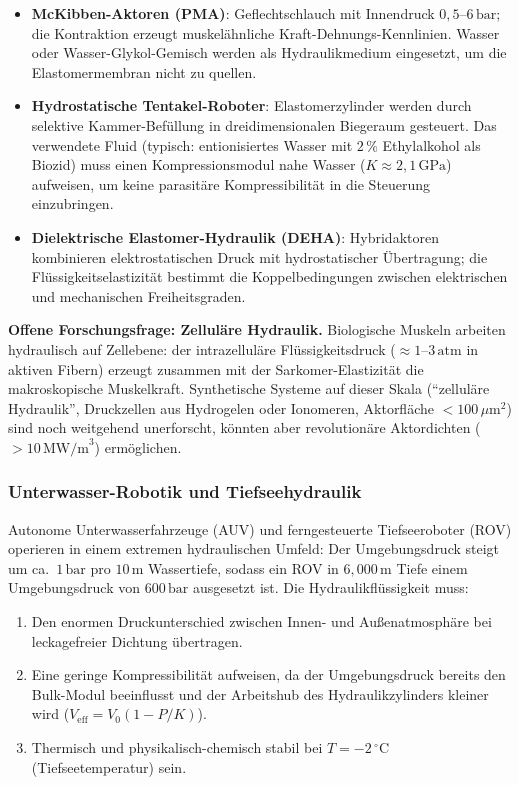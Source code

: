 ﻿\documentclass[a4paper,12pt]{scrreprt}
\theoremstyle{definition}
\begin{document}
\begin{itemize}
  \item \textbf{McKibben-Aktoren (PMA)}: Geflechtschlauch mit
    Innendruck $0{,}5$--$6\,\mathrm{bar}$; die Kontraktion erzeugt
    muskelähnliche Kraft-Dehnungs-Kennlinien. Wasser oder
    Wasser-Glykol-Gemisch werden als Hydraulikmedium eingesetzt,
    um die Elastomermembran nicht zu quellen.
  \item \textbf{Hydrostatische Tentakel-Roboter}: Elastomerzylinder
    werden durch selektive Kammer-Befüllung in dreidimensionalen
    Biegeraum gesteuert. Das verwendete Fluid (typisch:
    entionisiertes Wasser mit $2\,\%$ Ethylalkohol als Biozid)
    muss einen Kompressionsmodul nahe Wasser ($K \approx 2{,}1\,\mathrm{GPa}$)
    aufweisen, um keine parasitäre Kompressibilität in die Steuerung
    einzubringen.
  \item \textbf{Dielektrische Elastomer-Hydraulik (DEHA)}: Hybridaktoren
    kombinieren elektrostatischen Druck mit hydrostatischer Übertragung;
    die Flüssigkeitselastizität bestimmt die Koppelbedingungen zwischen
    elektrischen und mechanischen Freiheitsgraden.
\end{itemize}

\begin{infobox}
\textbf{Offene Forschungsfrage: Zelluläre Hydraulik.}
Biologische Muskeln arbeiten hydraulisch auf Zellebene: der intrazelluläre
Flüssigkeitsdruck ($\approx 1$--$3\,\mathrm{atm}$ in aktiven Fibern)
erzeugt zusammen mit der Sarkomer-Elastizität die makroskopische
Muskelkraft. Synthetische Systeme auf dieser Skala (``zelluläre
Hydraulik'', Druckzellen aus Hydrogelen oder Ionomeren,
Aktorfläche $< 100\,\mu\mathrm{m}^2$) sind noch weitgehend
unerforscht, könnten aber revolutionäre Aktordichten
($> 10\,\mathrm{MW/m}^3$) ermöglichen.
\end{infobox}

\subsubsection{Unterwasser-Robotik und Tiefseehydraulik}

Autonome Unterwasserfahrzeuge (AUV) und ferngesteuerte Tiefseeroboter
(ROV) operieren in einem extremen hydraulischen Umfeld: Der
Umgebungsdruck steigt um ca.\ $1\,\mathrm{bar}$ pro $10\,\mathrm{m}$
Wassertiefe, sodass ein ROV in $6{,}000\,\mathrm{m}$ Tiefe einem
Umgebungsdruck von $600\,\mathrm{bar}$ ausgesetzt ist. Die
Hydraulikflüssigkeit muss:

\begin{enumerate}
  \item Den enormen Druckunterschied zwischen Innen- und Außenatmosphäre
    bei leckagefreier Dichtung übertragen.
  \item Eine geringe Kompressibilität aufweisen, da der Umgebungsdruck
    bereits den Bulk-Modul beeinflusst und der Arbeitshub des
    Hydraulikzylinders kleiner wird ($V_{\mathrm{eff}} = V_0 (1 - P/K)$).
  \item Thermisch und physikalisch-chemisch stabil bei
    $T = -2\,{^\circ}\mathrm{C}$ (Tiefseetemperatur) sein.
\end{enumerate}
\end{document}
